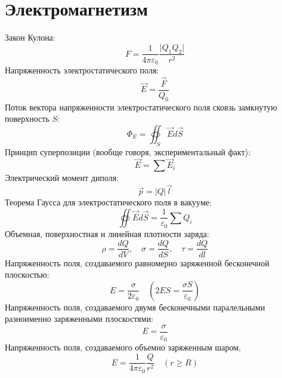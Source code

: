 \documentclass[twoside, a4paperpt, fleqn]{extarticle}
\begin{document}
\section*{Электромагнетизм}
Закон Кулона:
\begin{equation*}
    F = \frac{1}{4 \pi \varepsilon_0} \frac{\vert Q_1 Q_2 \vert}{r^2}
\end{equation*}
Напряженность электростатического поля:
\begin{equation*}
    \vec{E} = \frac{\vec{F}}{Q_0}
\end{equation*}
Поток вектора напряженности электростатического поля сковзь замкнутую поверхность $S$:
\begin{equation*}
    \label{ phi_E }
    \Phi_E = \oiint_S \vec{E} d \vec{S}
\end{equation*}
Принцип суперпозиции (вообще говоря, экспериментальный факт):
\begin{equation*}
    \vec{E} = \sum \vec{E}_i
\end{equation*}
Электрический момент диполя:
\begin{equation*}
    \vec{p} = |Q| \vec{l}
\end{equation*}
Теорема Гаусса для электростатического поля в вакууме:
\begin{equation*}
    \oiint \vec{E} d \vec{S} = \frac{1}{\varepsilon_0} \sum Q_i
\end{equation*}
Объемная, поверхностная и линейная плотности заряда:
\begin{equation*}
    \rho = \frac{d Q}{d V}, \quad \sigma = \frac{d Q}{d S}, \quad \tau = \frac{d Q}{ d l}
\end{equation*}
Напряженность поля, создаваемого равномерно заряженной бесконечной плоскостью:
\begin{equation*}
    E = \frac{\sigma}{2 \varepsilon_0} \quad (2 E S = \frac{\sigma S}{\varepsilon_0})
\end{equation*}
Напряженность поля, создаваемого двумя бесконечными паралельными разноименно заряженными плоскостями:
\begin{equation*}
    E = \frac{\sigma}{\varepsilon_0}
\end{equation*}
Напряженность поля, создаваемого объемно заряженным шаром,
\begin{equation*}
E = \frac{1}{4 \pi \varepsilon_0} \frac{Q}{r^2} \quad (r \geq R)
\end{equation*}
\end{document}
